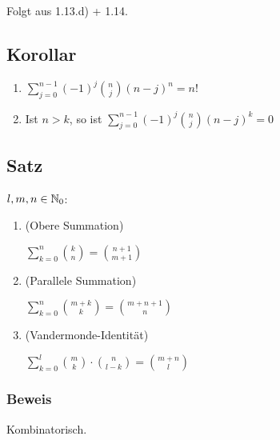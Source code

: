 Folgt aus 1.13.d) + 1.14. %


\subsection{Korollar}
\begin{enumerate}
	\item $\sum_{j=0}^{n-1}(-1)^j\binom{n}{j}(n-j)^n = n!$
	
	\item Ist $n>k$, so ist $\sum_{j=0}^{n-1}(-1)^j\binom{n}{j}(n-j)^k=0$
\end{enumerate}


\subsection{Satz} %
$l, m, n \in \operatorname{\mathbb{N}}_0$:

\begin{enumerate}
	\item (Obere Summation)
	
	$\sum_{k=0}^{n}\binom{k}{n} = \binom{n+1}{m+1} $
	
	\item (Parallele Summation)
	
	$\sum_{k=0}^{n}\binom{m+k}{k} = \binom{m+n+1}{n} $
	
	\item (Vandermonde-Identität)
	
	$ \sum_{k=0}^{l}\binom{m}{k}\cdot\binom{n}{l-k} = \binom{m+n}{l} $   
	
\end{enumerate}

\subsubsection*{Beweis}

Kombinatorisch.

